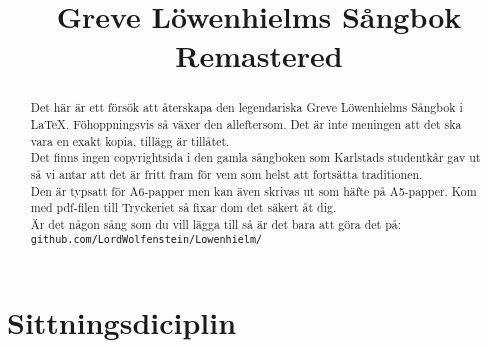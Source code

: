 \documentclass[twoside, openright]{report}
\title{Greve Löwenhielms Sångbok Remastered}
\begin{document}
\maketitle
\thispagestyle{empty}

\cleardoublepage
\begin{abstract}
Det här är ett försök att återskapa den legendariska Greve Löwenhielms Sångbok i \LaTeX. Fö\-hoppningsvis så växer den alleftersom. Det är inte meningen att det ska vara en exakt kopia, tillägg är tillåtet.\\

Det finns ingen copyrightsida i den gamla sångboken som Karlstads studentkår gav ut så vi antar att det är fritt fram för vem som helst att fortsätta traditionen.\\

Den är typsatt för A6-papper men kan även skrivas ut som häfte på A5-papper. Kom med pdf-filen till Tryckeriet så fixar dom det säkert åt dig.\\

Är det någon sång som du vill lägga till så är det bara att göra det på:\\
\texttt{\small github.com/LordWolfenstein/Lowenhielm/}
\end{abstract}
\thispagestyle{empty}
\tableofcontents

\chapter*{Sittningsdiciplin}
\end{document}
